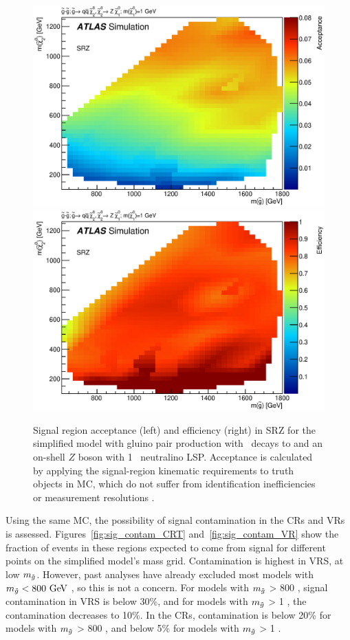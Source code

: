\begin{figure}[ht]
\centering
\includegraphics[width=.48\textwidth]{figures/signalacceptcontam/acc_SM_GG_N2_1.eps}
\includegraphics[width=.48\textwidth]{figures/signalacceptcontam/eff_SM_GG_N2_1.eps}
\caption{
Signal region acceptance (left) and efficiency (right) in SRZ for the simplified model with gluino pair production with \chitwozero\ decays to \chionezero and an on-shell $Z$ boson with 1 \gev~neutralino LSP.  
Acceptance is calculated by applying the signal-region kinematic requirements to truth objects in \ac{MC}, which do not suffer from identification inefficiencies or measurement resolutions \cite{this_paper}.
}
\label{fig:acc_SMGGN2_1_z}
\end{figure}

Using the same \ac{MC}, the possibility of signal contamination in the \acp{CR} and \acp{VR} is assessed. Figures~\ref{fig:sig_contam_CRT} and~\ref{fig:sig_contam_VR} show the fraction of events in these regions expected to come from signal for different points on the simplified model's mass grid. Contamination is highest in VRS, at low $m_{\tilde g}$. However, past analyses have already excluded most models with $m_\go < 800 \gev$ \cite{SUSY-2014-10}, so this is not a concern. For models with $m_{\tilde g}$ > 800 \gev, signal contamination in VRS is below 30\%, and for models with $m_{\tilde g}$ > 1 \tev, the contamination decreases to 10\%. In the \acp{CR}, contamination is below 20\% for models with $m_{\tilde g}$ > 800 \gev, and below 5\% for models with $m_{\tilde g}$ > 1 \tev. 

